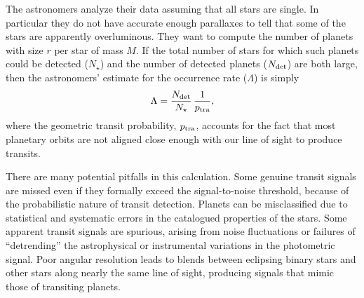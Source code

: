 \documentclass[12pt,modern]{aastex61}
\begin{document}
The astronomers analyze their data assuming that all stars are
single.  In particular they do not have accurate enough parallaxes to
tell that some of the stars are apparently overluminous.  They want to
compute the number of planets with size $r$ per star of mass $M$.  If
the total number of stars for which such planets could be detected
($N_\star$) and the number of detected planets ($N_{\rm det}$) are
both large, then the astronomers' estimate for the occurrence rate
($\Lambda$) is simply
\begin{equation}
  \Lambda = \frac{N_{\rm det}}{N_\star}
                    \, \frac{1}{p_{\rm tra}},
\label{eq:occ_rate_simple}
\end{equation}
where the geometric transit probability, $p_{\rm tra}$, accounts for
the fact that most planetary orbits are not aligned close enough with
our line of sight to produce transits.

There are many potential pitfalls in this calculation.  Some genuine
transit signals are missed even if they formally exceed the
signal-to-noise threshold, because of the probabilistic nature of
transit detection.  Planets can be misclassified due to statistical
and systematic errors in the catalogued properties of the stars.  Some
apparent transit signals are spurious, arising from noise fluctuations
or failures of ``detrending'' the astrophysical or instrumental
variations in the photometric signal.  Poor angular resolution leads
to blends between eclipsing binary stars and other stars along nearly
the same line of sight, producing signals that mimic those of
transiting planets.
\end{document}
